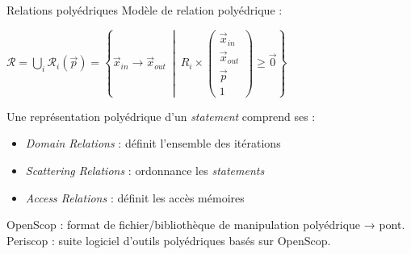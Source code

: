\documentclass[5pt, compress]{beamer}
\begin{document}
    \begin{frame}{Relations polyédriques}
        Modèle de relation polyédrique :
        \begin{center}
            $ \mathcal{R} = \bigcup\limits_i \mathcal{R}_i(\vec{p})= \left\{
                \vec{x}_{in} \rightarrow \vec{x}_{out}
                \ \middle| \ 
                R_i \times \left(\begin{array}{c}
                    \vec{x}_{in} \\
                    \vec{x}_{out} \\
                    \vec{p} \\
                    1
            \end{array} \right) \geq \vec{0}
            \right\}$
        \end{center}

        \pause
        \vspace{2em}

        Une représentation polyédrique d'un \textit{statement} comprend ses :
        \begin{itemize}\itemsep0em
            \vspace{-1em}
            \item \textit{Domain Relations} : définit l'ensemble des itérations
            \item \textit{Scattering Relations} : ordonnance les \textit{statements}
            \item \textit{Access Relations} : définit les accès mémoires
            \end{itemize}

            OpenScop : format de fichier/bibliothèque de manipulation polyédrique → pont.\\
            Periscop : suite logiciel d'outils polyédriques basés sur OpenScop.
    \end{frame}
\end{document}
